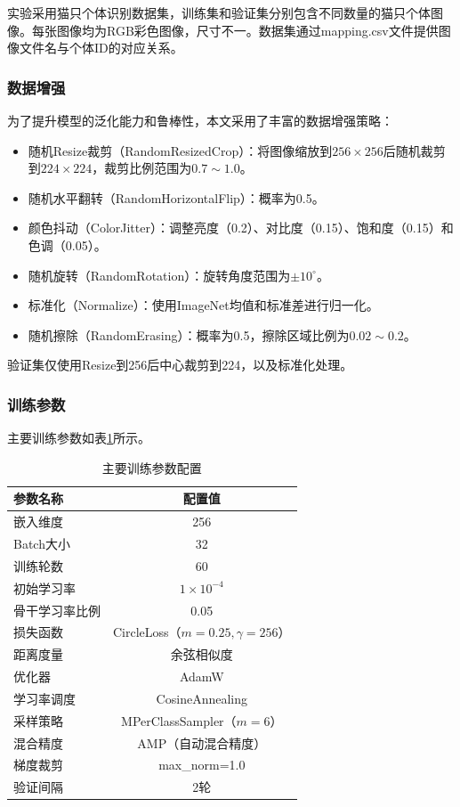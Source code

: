 \documentclass[a4paper]{article}
\begin{document}
实验采用猫只个体识别数据集，训练集和验证集分别包含不同数量的猫只个体图像。每张图像均为RGB彩色图像，尺寸不一。数据集通过mapping.csv文件提供图像文件名与个体ID的对应关系。

\subsubsection{数据增强}

为了提升模型的泛化能力和鲁棒性，本文采用了丰富的数据增强策略：

\begin{itemize}
    \item 随机Resize裁剪（RandomResizedCrop）：将图像缩放到$256\times256$后随机裁剪到$224\times224$，裁剪比例范围为$0.7\sim1.0$。
    \item 随机水平翻转（RandomHorizontalFlip）：概率为0.5。
    \item 颜色抖动（ColorJitter）：调整亮度（0.2）、对比度（0.15）、饱和度（0.15）和色调（0.05）。
    \item 随机旋转（RandomRotation）：旋转角度范围为$\pm10^\circ$。
    \item 标准化（Normalize）：使用ImageNet均值和标准差进行归一化。
    \item 随机擦除（RandomErasing）：概率为0.5，擦除区域比例为$0.02\sim0.2$。
\end{itemize}

验证集仅使用Resize到256后中心裁剪到224，以及标准化处理。

\subsubsection{训练参数}

主要训练参数如表\ref{tab:params}所示。

\begin{table}[htbp]
\centering
\caption{主要训练参数配置}
\label{tab:params}
\begin{tabular}{lc}
\toprule
参数名称 & 配置值 \\
\midrule
嵌入维度 & 256 \\
Batch大小 & 32 \\
训练轮数 & 60 \\
初始学习率 & $1\times10^{-4}$ \\
骨干学习率比例 & 0.05 \\
\hline
损失函数 & CircleLoss（$m=0.25, \gamma=256$） \\
距离度量 & 余弦相似度 \\
优化器 & AdamW \\
学习率调度 & CosineAnnealing \\
采样策略 & MPerClassSampler（$m=6$） \\
\hline
混合精度 & AMP（自动混合精度） \\
梯度裁剪 & max\_norm=1.0 \\
验证间隔 & 2轮 \\
\bottomrule
\end{tabular}
\end{table}
\end{document}

